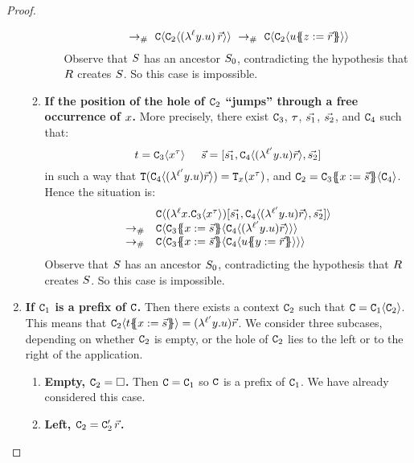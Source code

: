 \begin{proof}
\begin{enumerate}
\begin{enumerate}
\begin{enumerate}
\[        \ \todist\ %
        \conof{\con_2\of{ (\lamp{\lab}{\vartwo}{\tmthree})\,\ls{\tmfour} }}
        \ \todist\ %
        \conof{\con_2\of{ \tmthree\sub{\varthree}{\ls{\tmfour}} }}
      \]
      Observe that $S$ has an ancestor $S_0$, contradicting the hypothesis that $R$ creates $S$.
      So this case is impossible.
    \end{enumerate}
  \item {\bf If the position of the hole of $\mathtt{C}_2$ ``jumps'' through a free occurrence of $x$.}
    More precisely,
    there exist $\mathtt{C}_3$, $\tau$, $\vec{s_1}$, $\vec{s_2}$, and $\mathtt{C}_4$
    such that:
    \[
      t = \mathtt{C}_3\langle x^{\tau}\rangle
      \hspace{.5cm}
      \vec{s} = [\vec{s_1},\mathtt{C}_4\langle (\lambda^{\ell'} y. u)\vec{r} \rangle,\vec{s_2}]
    \]
    in such a way that $\mathtt{T}(\mathtt{C}_4\langle (\lambda^{\ell'} y. u)\vec{r} \rangle) = \mathtt{T}_{x}(x^{\tau})$,
    and $\mathtt{C}_2 = \mathtt{C}_3\{\!\!\{x := \vec{s}\}\!\!\}\langle\mathtt{C}_4\rangle$.
    Hence the situation is:
    \[
      \begin{array}{rl}
              & \conof{(\lamp{\lab}{\var}{\con_3\of{\var^{\typ}}})[\ls{\tmtwo_1},\con_4\of{ (\lamp{\labtwo}{\vartwo}{\tmthree})\ls{\tmfour} },\ls{\tmtwo_2}]} \\
      \todist & \conof{\con_3\sub{\var}{\ls{\tmtwo}}\of{\con_4\of{(\lamp{\labtwo}{\vartwo}{\tmthree})\ls{\tmfour}}}} \\
      \todist & \conof{\con_3\sub{\var}{\ls{\tmtwo}}\of{\con_4\of{ \tmthree\sub{\vartwo}{\ls{\tmfour}} }}}
      \end{array}
    \]
    Observe that $S$ has an ancestor $S_0$, contradicting the hypothesis that $R$ creates $S$.
    So this case is impossible.
  \end{enumerate}
\item {\bf If $\mathtt{C}_1$ is a prefix of $\mathtt{C}$.}
  Then there exists a context $\mathtt{C}_2$ such that $\mathtt{C} = \mathtt{C}_1\langle\mathtt{C}_2\rangle$.
  This means that $\mathtt{C}_2\langle t\{\!\!\{x := \vec{s}\}\!\!\}\rangle = (\lambda^{\ell'} y. u)\vec{r}$.
  We consider three subcases, depending on whether $\mathtt{C}_2$ is empty,
  or the hole of $\mathtt{C}_2$ lies to the left or to the right of the application.
  \begin{enumerate}
  \item {\bf Empty, $\mathtt{C}_2 = \Box$.}
    Then $\mathtt{C} = \mathtt{C}_1$ so $\mathtt{C}$ is a prefix of $\mathtt{C}_1$. We have already considered this case.
  \item {\bf Left, $\mathtt{C}_2 = \mathtt{C}'_2\,\vec{r}$.}

\end{enumerate}
\end{enumerate}
\end{proof}
